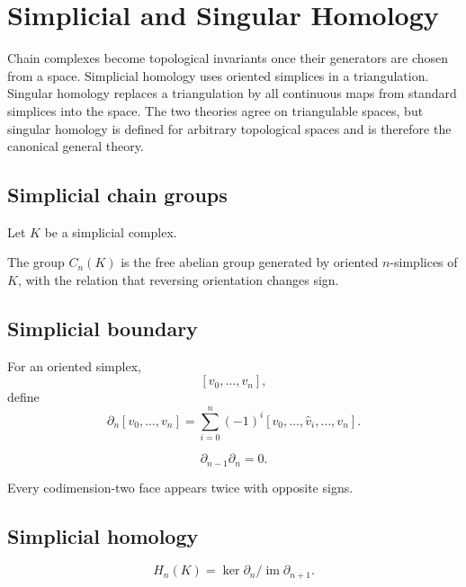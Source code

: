 ﻿\chapter{Simplicial and Singular Homology}
\label{ch:viii17-simplicial-singular-homology}

Chain complexes become topological invariants once their generators are chosen
from a space.  Simplicial homology uses oriented simplices in a triangulation.
Singular homology replaces a triangulation by all continuous maps from standard
simplices into the space.  The two theories agree on triangulable spaces, but
singular homology is defined for arbitrary topological spaces and is therefore
the canonical general theory.

\section{Simplicial chain groups}

Let \(K\) be a simplicial complex.

\begin{definition}
\label{def:viii17-simplicial-chain}
The group \(C_n(K)\) is the free abelian group generated by oriented
\(n\)-simplices of \(K\), with the relation that reversing orientation changes
sign.
\end{definition}

\section{Simplicial boundary}

For an oriented simplex,
\[
[v_0,\dots,v_n],
\]
define
\[
\partial_n[v_0,\dots,v_n]
=
\sum_{i=0}^n
(-1)^i
[v_0,\dots,\widehat v_i,\dots,v_n].
\]

\begin{theorem}
\label{thm:viii17-boundary-square}
\[
\partial_{n-1}\partial_n=0.
\]
\end{theorem}

Every codimension-two face appears twice with opposite signs.

\section{Simplicial homology}

\begin{definition}
\label{def:viii17-simplicial-homology}
\[
H_n(K)
=
\ker\partial_n/\operatorname{im}\partial_{n+1}.
\]
\end{definition}

